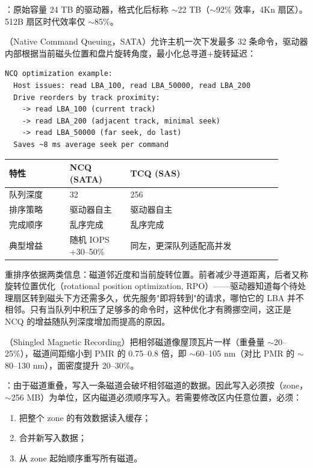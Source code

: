 ：原始容量 24 TB 的驱动器，格式化后标称 $\sim$22 TB（$\sim$92\% 效率，4Kn 扇区）。512B 扇区时代效率仅 $\sim$85\%。


（Native Command Queuing，SATA）允许主机一次下发最多 32 条命令，驱动器内部根据当前磁头位置和盘片旋转角度，最小化总寻道+旋转延迟：

\begin{lstlisting}
NCQ optimization example:
  Host issues: read LBA_100, read LBA_50000, read LBA_200
  Drive reorders by track proximity:
    -> read LBA_100 (current track)
    -> read LBA_200 (adjacent track, minimal seek)
    -> read LBA_50000 (far seek, do last)
  Saves ~8 ms average seek per command
\end{lstlisting}

\begin{longtable}{L{0.2\linewidth}L{0.2\linewidth}L{0.5\linewidth}}
\toprule
特性 & NCQ (SATA) & TCQ (SAS) \\
\midrule
队列深度 & 32 & 256 \\
排序策略 & 驱动器自主 & 驱动器自主 \\
完成顺序 & 乱序完成 & 乱序完成 \\
典型增益 & 随机 IOPS +30--50\% & 同左，更深队列适配高并发 \\
\bottomrule
\end{longtable}

重排序依据两类信息：磁道邻近度和当前旋转位置。前者减少寻道距离，后者又称旋转位置优化（rotational position optimization, RPO）——驱动器知道每个待处理扇区转到磁头下方还需多久，优先服务"即将转到"的请求，哪怕它的 LBA 并不相邻。只有当队列中积压了足够多的命令时，这种优化才有腾挪空间，这正是 NCQ 的增益随队列深度增加而提高的原因。


（Shingled Magnetic Recording）把相邻磁道像屋顶瓦片一样（重叠量 $\sim$20--25\%），磁道间距缩小到 PMR 的 0.75--0.8 倍，即 $\sim$60--105 nm（对比 PMR 的 $\sim$80--130 nm），面密度提升 20--30\%。

：由于磁道重叠，写入一条磁道会破坏相邻磁道的数据。因此写入必须按（zone，$\sim$256 MB）为单位，区内磁道必须顺序写入。若需要修改区内任意位置，必须：
\begin{enumerate}
\item 把整个 zone 的有效数据读入缓存；
\item 合并新写入数据；
\item 从 zone 起始顺序重写所有磁道。
\end{enumerate}

